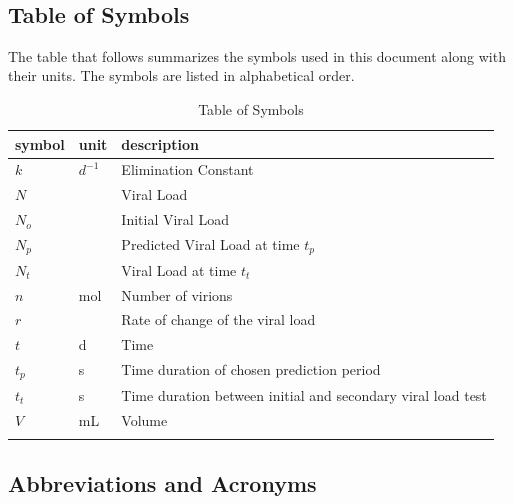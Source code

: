 \documentclass[12pt]{article}
\begin{document}
 
~\newpage
\subsection{Table of Symbols}

The table that follows summarizes the symbols used in this document along with
their units. The symbols are listed in alphabetical order.

\begin{table}[H]
\renewcommand{\arraystretch}{1.2}
\noindent \begin{longtable*}{l l p{12cm}} \toprule
\textbf{symbol} & \textbf{unit} & \textbf{description}\\
\midrule 
$k$ & $d^{-1}$ & Elimination Constant
\\
$N$ & \si[per-mode=symbol]{\dfrac{\mol}{\mL}} & Viral Load
\\ 
$N_{o}$ & \si[per-mode=symbol]{\dfrac{\mol}{\mL}} & Initial Viral Load
\\ 
$N_{p}$ & \si[per-mode=symbol]{\dfrac{\mol}{\mL}} & Predicted Viral Load at time 
$t_{p}$
\\ 
$N_{t}$ & \si[per-mode=symbol]{\dfrac{\mol}{\mL}} & Viral Load at time $t_{t}$
\\ 
$n$ & \si[per-mode=symbol]{\mol} & Number of virions
\\ 
$r$ & \si[per-mode=symbol] {} & Rate of change of the viral 
load
\\
$t$ & \si[per-mode=symbol] {\day} & Time
\\

$t_{p}$ & \si[per-mode=symbol] {\second} & Time duration of chosen prediction 
period 
\\
$t_{t}$ & \si[per-mode=symbol] {\second} & Time duration between initial and  
secondary viral load test
\\
$V$ & \si[per-mode=symbol] {\mL} & Volume
\\
&\\
\bottomrule

\end{longtable*}
\caption{Table of Symbols}
\end{table}

\newpage

\subsection{Abbreviations and Acronyms}
\end{document}
